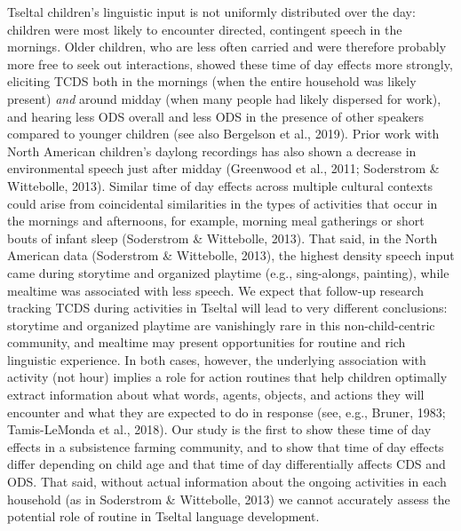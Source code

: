 \documentclass[floatsintext,man]{apa6}
\theoremstyle{definition}
\theoremstyle{definition}
\theoremstyle{definition}
\theoremstyle{remark}
\begin{document}
Tseltal children's linguistic input is not uniformly distributed over
the day: children were most likely to encounter directed, contingent
speech in the mornings. Older children, who are less often carried and
were therefore probably more free to seek out interactions, showed these
time of day effects more strongly, eliciting TCDS both in the mornings
(when the entire household was likely present) \emph{and} around midday
(when many people had likely dispersed for work), and hearing less ODS
overall and less ODS in the presence of other speakers compared to
younger children (see also Bergelson et al., 2019). Prior work with
North American children's daylong recordings has also shown a decrease
in environmental speech just after midday (Greenwood et al., 2011;
Soderstrom \& Wittebolle, 2013). Similar time of day effects across
multiple cultural contexts could arise from coincidental similarities in
the types of activities that occur in the mornings and afternoons, for
example, morning meal gatherings or short bouts of infant sleep
(Soderstrom \& Wittebolle, 2013). That said, in the North American data
(Soderstrom \& Wittebolle, 2013), the highest density speech input came
during storytime and organized playtime (e.g., sing-alongs, painting),
while mealtime was associated with less speech. We expect that follow-up
research tracking TCDS during activities in Tseltal will lead to very
different conclusions: storytime and organized playtime are vanishingly
rare in this non-child-centric community, and mealtime may present
opportunities for routine and rich linguistic experience. In both cases,
however, the underlying association with activity (not hour) implies a
role for action routines that help children optimally extract
information about what words, agents, objects, and actions they will
encounter and what they are expected to do in response (see, e.g.,
Bruner, 1983; Tamis-LeMonda et al., 2018). Our study is the first to
show these time of day effects in a subsistence farming community, and
to show that time of day effects differ depending on child age and that
time of day differentially affects CDS and ODS. That said, without
actual information about the ongoing activities in each household (as in
Soderstrom \& Wittebolle, 2013) we cannot accurately assess the
potential role of routine in Tseltal language development.
\end{document}
